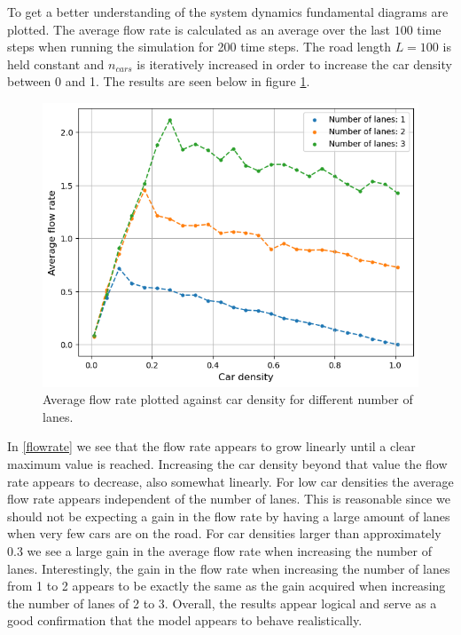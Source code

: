 \documentclass[a4paper,12pt]{article}
\begin{document}
To get a better understanding of the system dynamics fundamental diagrams are plotted. The average flow rate is calculated as an average over the last $100$ time steps when running
the simulation for 200 time steps. The road length $L=100$ is held constant and $n_{cars}$ is iteratively
increased in order to increase the car density between 0 and 1. The results are seen below in figure \ref*{fundamental diagram}.

\begin{figure}[H]
    \centering
    \includegraphics[scale=0.9]{Images/fundamental diagram 120.png}
    \caption{Average flow rate plotted against car density for different number of lanes.}
    \label{fundamental diagram}
\end{figure}

In \ref*{flowrate} we see that the flow rate appears to grow linearly until a clear maximum value is reached. Increasing the car density beyond
that value the flow rate appears to decrease, also somewhat linearly. For low car densities the average flow rate appears independent of the number of lanes.
This is reasonable since we should not be expecting a gain in the flow rate by having a large amount of lanes when very few cars are on the road.
For car densities larger than approximately 0.3 we see a large gain in the average flow rate when increasing the number of lanes. Interestingly, the gain in the
flow rate when increasing the number of lanes from 1 to 2 appears to be exactly the same as the gain acquired when increasing the number of lanes of 2 to 3.
Overall, the results appear logical and serve as a good confirmation that the model appears to behave realistically.
\end{document}
